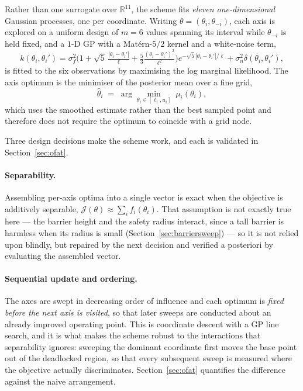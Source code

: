\documentclass[11pt,a4paper]{article}
\newcommand{\R}{\mathbb{R}}
\begin{document}
Rather than one surrogate over $\R^{11}$, the scheme fits \emph{eleven one-dimensional} Gaussian processes,
one per coordinate. Writing $\theta=(\theta_i,\theta_{-i})$, each axis is explored on a uniform design of
$m=6$ values spanning its interval while $\theta_{-i}$ is held fixed, and a $1$-D GP with a Mat\'ern-$5/2$
kernel and a white-noise term,
\begin{equation}
  k(\theta_i,\theta_i')=\sigma_f^2\Big(1+\sqrt5\,\tfrac{|\theta_i-\theta_i'|}{\ell}
  +\tfrac53\tfrac{(\theta_i-\theta_i')^2}{\ell^2}\Big)e^{-\sqrt5|\theta_i-\theta_i'|/\ell}
  +\sigma_n^2\delta(\theta_i,\theta_i'),
  \label{eq:kernel}
\end{equation}
is fitted to the six observations by maximising the log marginal likelihood. The axis optimum is the
minimiser of the posterior mean over a fine grid,
\begin{equation}
  \hat\theta_i \;=\; \arg\min_{\theta_i\in[\ell_i,u_i]}\; \mu_i(\theta_i),
  \label{eq:axisopt}
\end{equation}
which uses the smoothed estimate rather than the best sampled point and therefore does not require the
optimum to coincide with a grid node.

Three design decisions make the scheme work, and each is validated in Section~\ref{sec:ofat}.

\paragraph{Separability.} Assembling per-axis optima into a single vector is exact when the objective is
additively separable, $\mathcal{J}(\theta)\approx\sum_i f_i(\theta_i)$. That assumption is not exactly true
here --- the barrier height and the safety radius interact, since a tall barrier is harmless when its radius
is small (Section~\ref{sec:barriersweep}) --- so it is not relied upon blindly, but repaired by the next
decision and verified a posteriori by evaluating the assembled vector.

\paragraph{Sequential update and ordering.} The axes are swept in decreasing order of influence and each
optimum is \emph{fixed before the next axis is visited}, so that later sweeps are conducted about an already
improved operating point. This is coordinate descent with a GP line search, and it is what makes the scheme
robust to the interactions that separability ignores: sweeping the dominant coordinate first moves the base
point out of the deadlocked region, so that every subsequent sweep is measured where the objective actually
discriminates. Section~\ref{sec:ofat} quantifies the difference against the naive arrangement.
\end{document}
